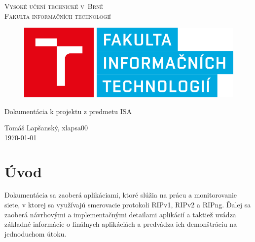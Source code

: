 \documentclass{report}
\begin{document}
	\begin{titlepage}
		\pagebreak
        \hspace{0pt}
        
		\vfill
		\begin{center}
			{\scshape\Huge{
					Vysoké učení technické v~Brně\\ Fakulta informačních technologií}
			}
		\end{center}
		\vspace{1cm}
		\begin{figure}[h]
			\begin{center}
				\includegraphics[width=12cm]{fit.png}
			\end{center}
		\end{figure}
		\vspace{2cm}  
		\begin{center}
			{\huge{
					Dokumentácia k projektu z predmetu ISA\\ } }
		\end{center}
		\vspace{1.2cm}
		\begin{center}		
			{\LARGE{Tomáš Lapšanský, xlapsa00 \\ \vspace{0.6cm}
					\today}}		
		\end{center} 
		
		\vfill
        \hspace{0pt}
        \pagebreak
	\end{titlepage}

	\tableofcontents
	
	\newpage
	
	\section{Úvod}

	\large

	Dokumentácia sa zaoberá aplikáciami, ktoré slúžia na prácu a monitorovanie siete, v ktorej sa využívajú smerovacie protokoli RIPv1, RIPv2 a RIPng. Ďalej sa zaoberá návrhovými a implementačnými detailami aplikácií a taktiež uvádza základné informácie o finálnych aplikáciách a predvádza ich demonštráciu na jednoduchom útoku.
	
\end{document}
